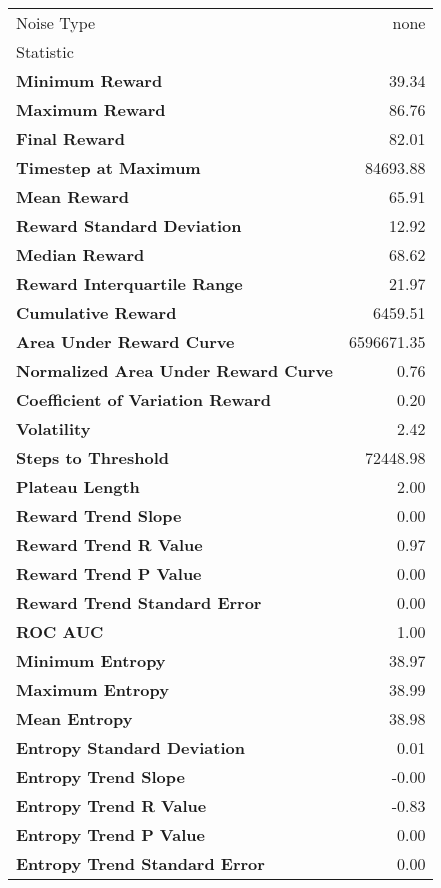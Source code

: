 \begin{tabular}{lr}
\toprule
Noise Type & none \\
Statistic &  \\
\midrule
\textbf{Minimum Reward} & 39.34 \\
\textbf{Maximum Reward} & 86.76 \\
\textbf{Final Reward} & 82.01 \\
\textbf{Timestep at Maximum} & 84693.88 \\
\textbf{Mean Reward} & 65.91 \\
\textbf{Reward Standard Deviation} & 12.92 \\
\textbf{Median Reward} & 68.62 \\
\textbf{Reward Interquartile Range} & 21.97 \\
\textbf{Cumulative Reward} & 6459.51 \\
\textbf{Area Under Reward Curve} & 6596671.35 \\
\textbf{Normalized Area Under Reward Curve} & 0.76 \\
\textbf{Coefficient of Variation Reward} & 0.20 \\
\textbf{Volatility} & 2.42 \\
\textbf{Steps to Threshold} & 72448.98 \\
\textbf{Plateau Length} & 2.00 \\
\textbf{Reward Trend Slope} & 0.00 \\
\textbf{Reward Trend R Value} & 0.97 \\
\textbf{Reward Trend P Value} & 0.00 \\
\textbf{Reward Trend Standard Error} & 0.00 \\
\textbf{ROC AUC} & 1.00 \\
\textbf{Minimum Entropy} & 38.97 \\
\textbf{Maximum Entropy} & 38.99 \\
\textbf{Mean Entropy} & 38.98 \\
\textbf{Entropy Standard Deviation} & 0.01 \\
\textbf{Entropy Trend Slope} & -0.00 \\
\textbf{Entropy Trend R Value} & -0.83 \\
\textbf{Entropy Trend P Value} & 0.00 \\
\textbf{Entropy Trend Standard Error} & 0.00 \\
\bottomrule
\end{tabular}
